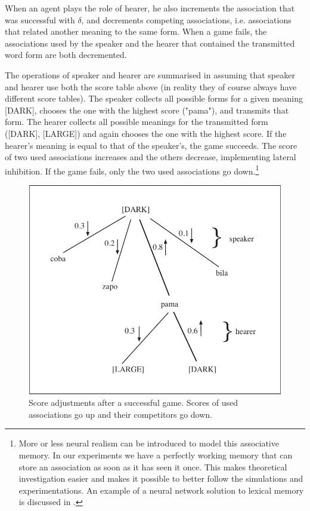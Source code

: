 When an agent plays the role of hearer, he also increments
the association that was successful with $\delta$, and 
decrements competing associations, i.e. associations that related
another meaning to the same form. When a 
game fails, the associations used by the speaker
and the hearer that contained the transmitted 
word form are both decremented. 

The operations of speaker and hearer are summarised in 
 assuming that speaker and hearer
use both the score table above (in reality they of 
course always have different score tables). 
The speaker collects all possible
forms for a given meaning [DARK], chooses the one with the
highest score ("pama"), and transmits that form. 
The hearer collects all possible meanings for 
the transmitted form ([DARK], [LARGE]) and again chooses the one with
the highest score. If the hearer's meaning is equal to that
of the speaker's, the game succeeds. The score of 
two used associations increases and the others
decrease, implementing lateral 
inhibition. If the game fails, only the two used associations 
go down.\footnote{More or less neural realism can be introduced to 
model this associative memory. In our experiments we 
have a perfectly working memory that can store an 
association as soon as it has seen it once. This makes
theoretical investigation easier and makes it possible
to better follow the simulations and experimentations.  
An example of a neural network solution to lexical
memory is discussed in \cite{Cangelosi:1996}.}

\begin{figure}[htbp]
  \centerline{\includegraphics[width=.60\textwidth]{chap5/figs/incr-decr}}
\caption{ \label{incr-decr} 
Score adjustments after a successful game. Scores of used 
associations go up and their competitors go down.}
\end{figure}

